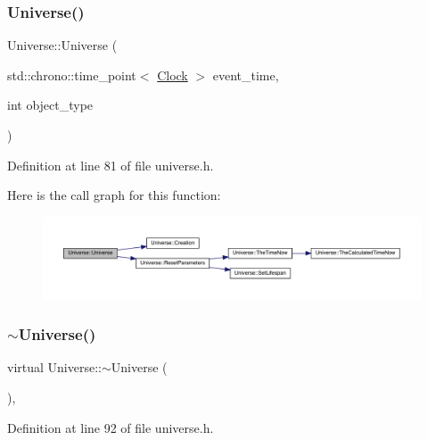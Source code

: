 \subsubsection{\texorpdfstring{Universe()}{Universe()}\hspace{0.1cm}{\footnotesize\ttfamily [3/3]}}
{\footnotesize\ttfamily Universe\+::\+Universe (\begin{DoxyParamCaption}\item[{std\+::chrono\+::time\+\_\+point$<$ \mbox{\hyperlink{universe_8h_a0ef8d951d1ca5ab3cfaf7ab4c7a6fd80}{Clock}} $>$}]{event\+\_\+time,  }\item[{int}]{object\+\_\+type }\end{DoxyParamCaption})\hspace{0.3cm}{\ttfamily [inline]}}



Definition at line 81 of file universe.\+h.

Here is the call graph for this function\+:\nopagebreak
\begin{figure}[H]
\begin{center}
\leavevmode
\includegraphics[width=350pt]{class_universe_a03af7455263d3028b55ca5dc93ebb6ba_cgraph}
\end{center}
\end{figure}
\mbox{\label{class_universe_ad4d90f6f2727992762c6b409d3d3d228}} 
\subsubsection{\texorpdfstring{$\sim$\+Universe()}{~Universe()}}
{\footnotesize\ttfamily virtual Universe\+::$\sim$\+Universe (\begin{DoxyParamCaption}{ }\end{DoxyParamCaption})\hspace{0.3cm}{\ttfamily [inline]}, {\ttfamily [virtual]}}



Definition at line 92 of file universe.\+h.



